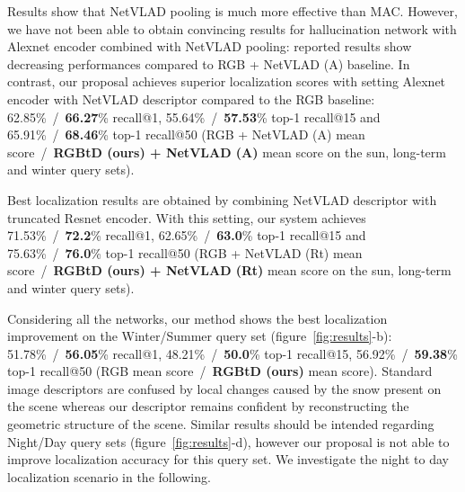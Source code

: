 Results show that NetVLAD pooling is much more effective than MAC. However, we have not been able to obtain convincing results for hallucination network with Alexnet encoder combined with NetVLAD pooling: reported results show decreasing performances compared to RGB + NetVLAD (A) baseline. In contrast, our proposal achieves superior localization scores with setting Alexnet encoder with NetVLAD descriptor compared to the RGB baseline: 62.85\%~/~\textbf{66.27}\% recall@1, 55.64\%~/~\textbf{57.53}\% top-1 recall@15 and 65.91\%~/~\textbf{68.46}\% top-1 recall@50  (RGB + NetVLAD (A) mean score~/~\textbf{RGBtD (ours) + NetVLAD (A)} mean score on the sun, long-term and winter query sets).

Best localization results are obtained by combining NetVLAD descriptor with truncated Resnet encoder. With this setting, our system achieves 71.53\%~/~\textbf{72.2}\% recall@1, 62.65\%~/~\textbf{63.0}\% top-1 recall@15 and 75.63\%~/~\textbf{76.0}\% top-1 recall@50  (RGB + NetVLAD (Rt) mean score~/~\textbf{RGBtD (ours) + NetVLAD (Rt)} mean score on the sun, long-term and winter query sets).

Considering all the networks, our method shows the best localization improvement on the Winter/Summer query set (figure~\ref{fig:results}-b): 51.78\%~/~\textbf{56.05}\% recall@1, 48.21\%~/~\textbf{50.0}\% top-1 recall@15, 56.92\%~/~\textbf{59.38}\% top-1 recall@50  (RGB mean score~/~\textbf{RGBtD (ours)} mean score). Standard image descriptors are confused by local changes caused by the snow present on the scene whereas our descriptor remains confident by reconstructing the geometric structure of the scene. Similar results should be intended regarding Night/Day query sets (figure~\ref{fig:results}-d), however our proposal is not able to improve localization accuracy for this query set. We investigate the night to day localization scenario in the following.

